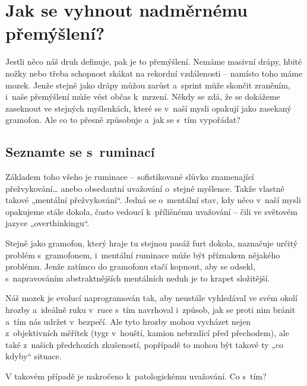 \documentclass[main.tex]{subfiles}
\begin{document}
\section{Jak se vyhnout nadměrnému přemýšlení?}
Jestli něco náš druh definuje, pak je to přemýšlení. Nemáme masivní drápy, hbité nožky nebo třeba schopnost skákat na rekordní vzdálenosti – namísto toho máme mozek. Jenže stejně jako drápy můžou zarůst a~sprint může skončit zraněním, i~naše přemýšlení může vést občas k~mrzení. Někdy se zdá, že se dokážeme zaseknout ve stejných myšlenkách, které se v~naší mysli opakují jako zasekaný gramofon. Ale co to přesně způsobuje a~jak se s~tím vypořádat?
\subsection*{Seznamte se s~ruminací}
Základem toho všeho je ruminace – sofistikované slůvko znamenající přežvykování… anebo obsedantní uvažování o~stejné myšlence. Takže vlastně takové „mentální přežvykování“. Jedná se o~mentální stav, kdy něco v~naší mysli opakujeme stále dokola, často vedoucí k~přílišnému uvažování – čili ve světovém jazyce „overthinkingu“.\par
Stejně jako gramofon, který hraje tu stejnou pasáž furt dokola, naznačuje určitý problém s~gramofonem, i~mentální ruminace může být příznakem nějakého problému. Jenže zatímco do gramofonu stačí kopnout, aby se odsekl, s~napravováním abstraktnějších mentálních neduh je to krapet složitější.\par
Náš mozek je evolucí naprogramován tak, aby neustále vyhledával ve svém okolí hrozby a~ideálně ruku v~ruce s~tím navrhoval i~způsob, jak se proti nim bránit a~tím nás udržet v~bezpečí. Ale tyto hrozby mohou vycházet nejen z~objektivních měřítek (tygr v~houští, kamion nebrzdící před přechodem), ale také z~našich předchozích zkušeností, popřípadě to mohou být takové ty „co kdyby“ situace.\par
V takovém případě je nakročeno k~patologickému uvažování. Co s~tím? 
\end{document}
